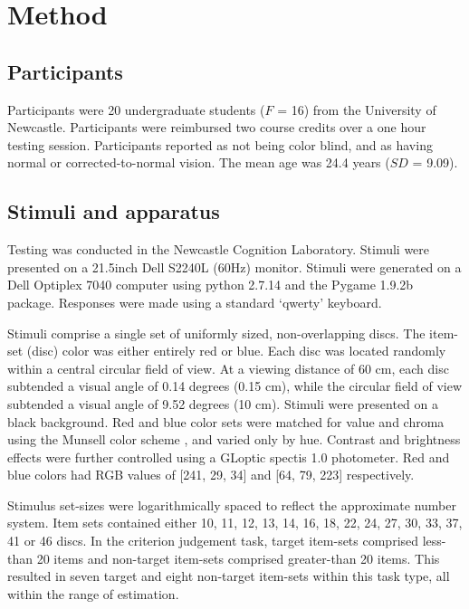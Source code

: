 \section{Method}
\subsection{Participants}
Participants were 20 undergraduate students ($F$ = 16) from the University of Newcastle. Participants were reimbursed two course credits over a one hour testing session. Participants reported as not being color blind, and as having normal or corrected-to-normal vision. The mean age was 24.4 years ($SD$ = 9.09).

\subsection{Stimuli and apparatus}
Testing was conducted in the Newcastle Cognition Laboratory. Stimuli were presented on a 21.5inch Dell S2240L (60Hz) monitor. Stimuli were generated on a Dell Optiplex 7040 computer using python 2.7.14 and the Pygame 1.9.2b package. Responses were made using a standard `qwerty' keyboard.

Stimuli comprise a single set of uniformly sized, non-overlapping discs. The item-set (disc) color was either entirely red or blue. Each disc was located randomly within a central circular field of view. At a viewing distance of 60 cm, each disc subtended a visual angle of 0.14 degrees (0.15 cm), while the circular field of view subtended a visual angle of 9.52 degrees (10 cm). Stimuli were presented on a black background. Red and blue color sets were matched for value and chroma using the Munsell color scheme \cite{Cochrane2014}, and varied only by hue. Contrast and brightness effects were further controlled using a GLoptic spectis 1.0 photometer. Red and blue colors had RGB values of [241, 29, 34] and [64, 79, 223] respectively. 

Stimulus set-sizes were logarithmically spaced to reflect the approximate number system. Item sets contained either 10, 11, 12, 13, 14, 16, 18, 22, 24, 27, 30, 33, 37, 41 or 46 discs. In the criterion judgement task, target item-sets comprised less-than 20 items and non-target item-sets comprised greater-than 20 items. This resulted in seven target and eight non-target item-sets within this task type, all within the range of estimation. 


